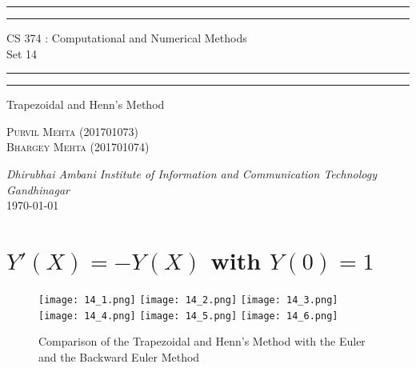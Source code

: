 \documentclass{article}
\begin{document}
\begin{titlepage}
	\centering 
	\scshape
	\vspace*{\baselineskip}
	\rule{\textwidth}{1.6pt}\vspace*{-\baselineskip}\vspace*{2pt}
	\rule{\textwidth}{0.4pt} 
	\vspace{0.75\baselineskip}
	
	{\Large CS 374 : Computational and Numerical Methods \\\vspace{0.75\baselineskip} Set 14}
	\vspace{0.75\baselineskip}
	
	\rule{\textwidth}{0.4pt}\vspace*{-\baselineskip}\vspace{3.2pt} 
	\rule{\textwidth}{1.6pt}
	
	\vspace{2\baselineskip}  
	Trapezoidal and Henn's Method
	
	\vspace*{3\baselineskip}
	
	\vspace{0.5\baselineskip} %
	
	{\scshape\large Purvil Mehta (201701073) \\ Bhargey Mehta (201701074) \\} 
	
	\vspace{1\baselineskip} 
	
	\textit{Dhirubhai Ambani Institute of Information and Communication Technology \\ Gandhinagar\\} 
	\vspace*{2\baselineskip}
	\today


\end{titlepage}

\newpage

\section{$Y'(X) = -Y(X)$ with $Y(0) = 1$}
\begin{figure}[!h]
    \centering
    \texttt{[image: 14\_1.png]}
    \texttt{[image: 14\_2.png]}
    \texttt{[image: 14\_3.png]}
    \texttt{[image: 14\_4.png]}
    \texttt{[image: 14\_5.png]}
    \texttt{[image: 14\_6.png]}
    \caption{Comparison of the Trapezoidal and Henn's Method with the Euler and the Backward Euler Method}
\end{figure}
\end{document}

